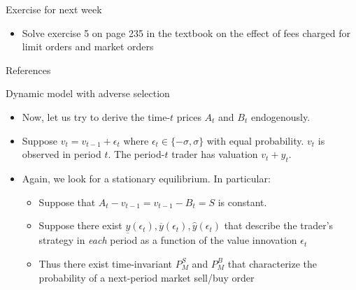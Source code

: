 \documentclass[english,10pt
,aspectratio=169
]{beamer}
\begin{document}
\begin{frame}{Exercise for next week}
	\begin{itemize}
		\item Solve exercise 5 on page 235 in the textbook on the effect of fees charged for limit orders and market orders
	\end{itemize}
\end{frame}





\appendix
\begin{frame}[allowframebreaks]{References}


\end{frame}


\begin{frame}[label=adverse]{Dynamic model with adverse selection}
	\begin{itemize}
		\item Now, let us try to derive the time-$t$ prices $A_t$ and $B_t$ endogenously. 
		\item Suppose $v_t=v_{t-1}+\epsilon_t$ where $\epsilon_t \in \{-\sigma, \sigma \}$ with equal probability. $v_t$ is observed in period $t$. The period-$t$ trader has valuation $v_t+y_t$. 
		\item Again, we look for a stationary equilibrium. In particular:
		\begin{itemize}
			\item Suppose that $A_t-v_{t-1}=v_{t-1}-B_t=S$ is constant.
			\item Suppose there exist $\underline{y}(\epsilon_t),\overline{y}(\epsilon_t),\hat{y}(\epsilon_t)$  that describe the trader's strategy in \textit{each} period  as a function of the value innovation $\epsilon_t$ 
			\item Thus there exist time-invariant $P^S_M$ and $P^B_M$ that characterize the probability of a next-period market sell/buy order 
		\end{itemize}
	\end{itemize}
\end{frame}
\end{document}
